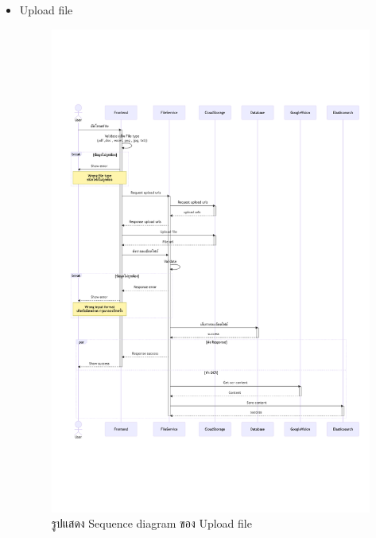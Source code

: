 \documentclass[12pt,oneside,openright,a4paper]{cpe-thai-project}
\begin{document}
\begin{itemize}
    \newpage
    \item Upload file \\
    \begin{figure}[!ht]\centering
        \includegraphics[width=13cm, trim={0 6cm 0 6cm},clip]{./assets/sequence-diagram/upload-file.png}
        \caption{รูปแสดง Sequence diagram ของ Upload file}\label{fig:sqUploadFile}
    \end{figure}



\end{itemize}
\end{document}
